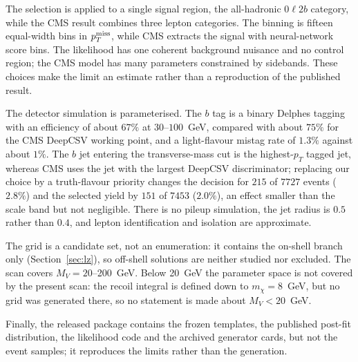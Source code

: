 The selection is applied to a single signal region, the all-hadronic $0\ell2b$ category, while the CMS result combines three lepton categories. The binning is fifteen equal-width bins in $p_T^{\rm miss}$, while CMS extracts the signal with neural-network score bins. The likelihood has one coherent background nuisance and no control region; the CMS model has many parameters constrained by sidebands. These choices make the limit an estimate rather than a reproduction of the published result.

The detector simulation is parameterised. The $b$ tag is a binary Delphes tagging with an efficiency of about $67\%$ at $30$--$100$~GeV, compared with about $75\%$ for the CMS DeepCSV working point, and a light-flavour mistag rate of $1.3\%$ against about $1\%$. The $b$ jet entering the transverse-mass cut is the highest-$p_T$ tagged jet, whereas CMS uses the jet with the largest DeepCSV discriminator; replacing our choice by a truth-flavour priority changes the decision for $215$ of $7727$ events ($2.8\%$) and the selected yield by $151$ of $7453$ ($2.0\%$), an effect smaller than the scale band but not negligible. There is no pileup simulation, the jet radius is $0.5$ rather than $0.4$, and lepton identification and isolation are approximate.

The grid is a candidate set, not an enumeration: it contains the on-shell branch only (Section~\ref{sec:lz}), so off-shell solutions are neither studied nor excluded. The scan covers $M_V=20$--200~GeV. Below 20~GeV the parameter space is not covered by the present scan: the recoil integral is defined down to $m_\chi=8$~GeV, but no grid was generated there, so no statement is made about $M_V<20$~GeV.

Finally, the released package contains the frozen templates, the published post-fit distribution, the likelihood code and the archived generator cards, but not the event samples; it reproduces the limits rather than the generation.
